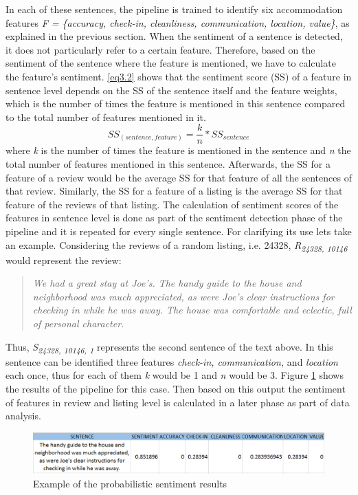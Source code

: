 In each of these sentences, the pipeline is trained to identify six accommodation features \textit{F = \{accuracy, check-in, cleanliness, communication, location, value\}}, as explained in the previous section. When the sentiment of a sentence is detected, it does not particularly refer to a certain feature. Therefore, based on the sentiment of the sentence where the feature is mentioned, we have to calculate the feature's sentiment.
\ref{eq3.2} shows that the sentiment score (SS) of a feature in sentence level depends on the SS of the sentence itself and the feature weights, which is the number of times the feature is mentioned in this sentence compared to the total number of features mentioned in it.
%
%
\begin{equation}
SS_{(sentence,feature)} = \frac{k}{n} * SS_{sentence}
\label{eq3.2}
\end{equation}
where \textit{k} is the number of times the feature is mentioned in the sentence and \textit{n} the total number of features mentioned in this sentence. Afterwards, the SS for a feature of a review would be the average SS for that feature of all the sentences of that review. Similarly, the SS for a feature of a listing is the average SS for that feature of the reviews of that listing.
The calculation of sentiment scores of the features in sentence level is done as part of the sentiment detection phase of the pipeline and it is repeated for every single sentence. For clarifying its use lets take an example. Considering the reviews of a random listing, i.e. 24328,  \textit{R\textsubscript{24328, 10146}} would represent the review:
\begin{quote}
\textit{We had a great stay at Joe's. The handy guide to the house and neighborhood was much appreciated, as were Joe's clear instructions for checking in while he was away. The house was comfortable and eclectic, full of personal character.}
\end{quote}
Thus, \textit{S\textsubscript{24328, 10146, 1}} represents the second sentence of the text above. In this sentence can be identified three features \textit{check-in, communication,} and \textit{location} each once, thus for each of them \textit{k} would be 1 and \textit{n} would be 3. Figure \ref{fig:sent} shows the results of the pipeline for this case. Then based on this output the sentiment of features in review and listing level is calculated in a later phase as part of data analysis.
\begin{figure}[h!]
	\centering
	\includegraphics[height=0.1\textheight]{example_pip}
	\caption{Example of the probabilistic sentiment results}
	\label{fig:sent}
\end{figure}
%
